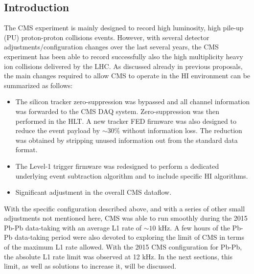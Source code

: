 \subsection{Introduction\label{subsec:HWintro}}
The CMS experiment is mainly designed to record high luminosity, high pile-up (PU) proton-proton collisions events.  However, with several detector adjustments/configuration changes over the last several years, the CMS experiment has been able to record successfully also the high multiplicity heavy ion collisions delivered by the LHC. As discussed already in previous
proposals, the main changes required to allow CMS to operate in the HI environment can be summarized as follows:

\begin{itemize}
 
\item The silicon tracker zero-suppression was bypassed and all channel information was forwarded to the CMS DAQ system. Zero-suppression was then performed in the HLT. A new tracker FED firmware was also designed to reduce the event payload by $\sim 30 \%$ without information loss. The reduction was obtained by stripping unused information out from the standard data format.  


\item The Level-1 trigger firmware was redesigned to perform a dedicated underlying event subtraction algorithm and to include specific HI algorithms.

\item Significant adjustment in the overall CMS dataflow.
\end{itemize}


With the specific configuration described above, and with a series of other small adjustments not mentioned here, CMS was able to run smoothly during the 2015 Pb-Pb data-taking with an average L1 rate of $\sim 10$ kHz. A few hours of the Pb-Pb data-taking
period were also devoted to exploring the limit of CMS in terms of the maximum L1 rate allowed.  With the 2015 CMS configuration for Pb-Pb, the absolute L1 rate limit was observed at 12 kHz. In the next sections, this limit, as well as solutions to increase it, will be discussed. 

